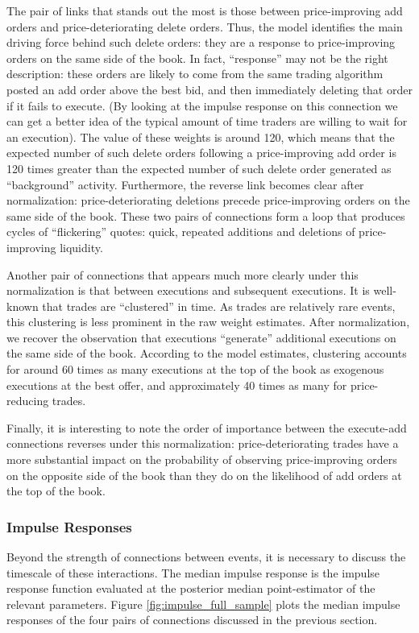 The pair of links that stands out the most is those between price-improving add orders and price-deteriorating delete orders. Thus, the model identifies the main driving force behind such delete orders: they are a response to price-improving orders on the same side of the book. In fact, “response” may not be the right description: these orders are likely to come from the same trading algorithm posted an add order above the best bid, and then immediately deleting that order if it fails to execute. (By looking at the impulse response on this connection we can get a better idea of the typical amount of time traders are willing to wait for an execution). The value of these weights is around 120, which means that the expected number of such delete orders following a price-improving add order is 120 times greater than the expected number of such delete order generated as “background” activity. Furthermore, the reverse link becomes clear after normalization: price-deteriorating deletions precede price-improving orders on the same side of the book. These two pairs of connections form a loop that produces cycles of “flickering” quotes: quick, repeated additions and deletions of price-improving liquidity.

Another pair of connections that appears much more clearly under this normalization is that between executions and subsequent executions. It is well-known that trades are “clustered” in time. As trades are relatively rare events, this clustering is less prominent in the raw weight estimates. After normalization, we recover the observation that executions “generate” additional executions on the same side of the book. According to the model estimates, clustering accounts for around 60 times as many executions at the top of the book as exogenous executions at the best offer, and approximately 40 times as many for price-reducing trades.

Finally, it is interesting to note the order of importance between the execute-add connections reverses under this normalization: price-deteriorating trades have a more substantial impact on the probability of observing price-improving orders on the opposite side of the book than they do on the likelihood of add orders at the top of the book.

\subsubsection{Impulse Responses}
Beyond the strength of connections between events, it is necessary to discuss the timescale of these interactions. The median impulse response is the impulse response function evaluated at the posterior median point-estimator of the relevant parameters. Figure \ref{fig:impulse_full_sample} plots the median impulse responses of the four pairs of connections discussed in the previous section.

